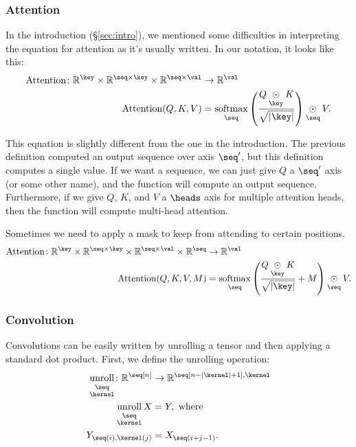 \documentclass{article}
\newcommand{\reals}{\mathbb{R}}
\begin{document}
\subsubsection{Attention}
\label{sec:attention}

In the introduction (\S\ref{sec:intro}), we mentioned some difficulties in interpreting the equation for attention as it's usually written. In our notation, it looks like this:
\begin{align*}
  \text{Attention} \colon \mathbb{R}^{\key} \times \mathbb{R}^{\seq \times\key} \times \mathbb{R}^{\seq \times\val} &\rightarrow \mathbb{R}^{\val} \\
  \text{Attention}(Q,K,V) &= \nfun{\seq}{softmax} \left( \frac{Q \ndot{\key} K}{\sqrt{|\key|}} \right) \ndot{\seq} V.
\end{align*}

This equation is slightly different from the one in the introduction. The previous definition computed an output sequence over axis $\seq'$, but this definition computes a single value. If we want a sequence, we can just give $Q$ a $\seq'$ axis (or some other name), and the function will compute an output sequence. Furthermore, if we give $Q$, $K$, and $V$ a $\heads$ axis for multiple attention heads, then the function will compute multi-head attention.

Sometimes we need to apply a mask to keep from attending to certain positions.
\begin{align*}
  \text{Attention} \colon \mathbb{R}^{\key} \times \mathbb{R}^{\seq \times\key} \times \mathbb{R}^{\seq \times\val} \times \mathbb{R}^{\seq} &\rightarrow \mathbb{R}^{\val} \\
\text{Attention}(Q, K, V, M) &= \nfun{\seq}{softmax} \left( \frac{Q \ndot{\key} K}{\sqrt{|\key|}} + M \right) \ndot{\seq} V.
\end{align*}

\subsubsection{Convolution}

Convolutions can be easily written by unrolling a tensor and then
applying a standard dot product. First, we define the unrolling operation:
\begin{align*}
  \nfun{\seq \\ \kernel}{unroll} \colon \reals^{\seq[n]} &\rightarrow \reals^{\seq[n-|\kernel|+1], \kernel} \\
  \nfun{\seq \\ \kernel}{unroll} X &= Y,\ \text{where} \\
  Y_{\seq(i), \kernel(j)} &= X_{\seq(i+j - 1)}.
\end{align*}
\end{document}
